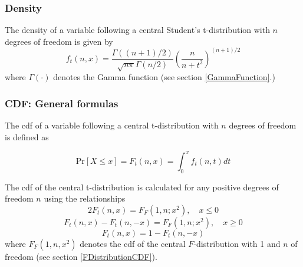 %



\subsubsection{Density}
\label{tDistributionDensity}
The density of a variable following a central Student's t-distribution with $n$ degrees of freedom is given by
\begin{equation}
	f_t(n,x) = \frac{\Gamma((n+1)/2)}{\sqrt{n\pi}\Gamma(n/2)} \left(\frac{n}{n+t^2}\right)^{(n+1)/2}
\end{equation}
where $\Gamma(\cdot)$ denotes the Gamma function (see section \ref{GammaFunction}.)



\subsubsection{CDF: General formulas}
\label{tDistributionCDF}
The cdf of a variable following a central  t-distribution with $n$ degrees of freedom is defined as

\begin{equation}
	\text{Pr}\left[X \le x\right] = F_t\left(n,x\right) =  \int_{0}^{x} f_t(n,t) dt
\end{equation}

The cdf of the central t-distribution is calculated for any positive degrees of freedom $n$ using the relationships
\begin{equation}
	2F_t\left(n,x\right) = F_F(1,n;x^2), \quad x \leq 0
\end{equation}
\begin{equation}
	F_t\left(n,x\right)-F_t\left(n,-x\right)  = F_F(1,n;x^2), \quad x \geq 0
\end{equation}
\begin{equation}
	F_t\left(n,x\right) = 1-F_t\left(n,-x\right) 
\end{equation}
where $F_F(1,n,x^2)$ denotes the cdf of the central $F$-distribution with 1 and $n$ of freedom (see section \ref{FDistributionCDF}).






